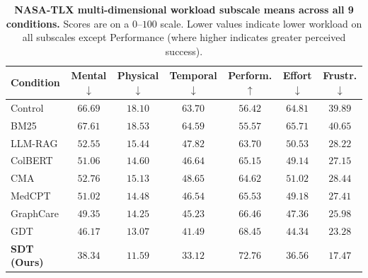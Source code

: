 \documentclass[12pt]{article}
\begin{document}
\vspace{1cm}

\begin{table}[t!]
  \centering
  \caption{\textbf{NASA-TLX multi-dimensional workload subscale means across all 9 conditions.} Scores are on a $0$--$100$ scale. Lower values indicate lower workload on all subscales except Performance (where higher indicates greater perceived success).}
  \label{tab:tlx_results}
  \small
  \begin{tabular}{@{}lcccccc@{}}
    \toprule
    \textbf{Condition} & \textbf{Mental} $\downarrow$ & \textbf{Physical} $\downarrow$ & \textbf{Temporal} $\downarrow$ & \textbf{Perform.} $\uparrow$ & \textbf{Effort} $\downarrow$ & \textbf{Frustr.} $\downarrow$ \\
    \midrule
    Control   & $66.69$ & $18.10$ & $63.70$ & $56.42$ & $64.81$ & $39.89$ \\
    BM25      & $67.61$ & $18.53$ & $64.59$ & $55.57$ & $65.71$ & $40.65$ \\
    LLM-RAG   & $52.55$ & $15.44$ & $47.82$ & $63.70$ & $50.53$ & $28.22$ \\
    ColBERT   & $51.06$ & $14.60$ & $46.64$ & $65.15$ & $49.14$ & $27.15$ \\
    CMA       & $52.76$ & $15.13$ & $48.65$ & $64.62$ & $51.02$ & $28.44$ \\
    MedCPT    & $51.02$ & $14.48$ & $46.54$ & $65.53$ & $49.18$ & $27.41$ \\
    GraphCare & $49.35$ & $14.25$ & $45.23$ & $66.46$ & $47.36$ & $25.98$ \\
    GDT       & $46.17$ & $13.07$ & $41.49$ & $68.45$ & $44.34$ & $23.28$ \\
    \midrule
    \textbf{SDT (Ours)} & $\mathbf{38.34}$ & $\mathbf{11.59}$ & $\mathbf{33.12}$ & $\mathbf{72.76}$ & $\mathbf{36.56}$ & $\mathbf{17.47}$ \\
    \bottomrule
  \end{tabular}
\end{table}

\vspace{1cm}
\end{document}
